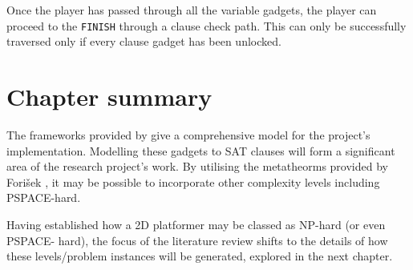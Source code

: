 \documentclass[11pt, a4paper, oneside]{report} %
\begin{document}
Once the player has passed through all the variable gadgets, the player can proceed to the
\texttt{FINISH} through a clause check path. This can only be successfully traversed only if every
clause gadget has been unlocked.






\section{Chapter summary}

The frameworks provided by \cite{Aloupis2012} give a comprehensive model for the
project's implementation. Modelling these gadgets to SAT clauses will form a
significant area of the research project's work. By utilising the metatheorms
provided by Fori\v{s}ek \cite{DBLP:conf/fun/Forisek10}, it may be possible to
incorporate other complexity levels including PSPACE-hard.

Having established how a 2D platformer may be classed as NP-hard (or even
PSPACE- hard), the focus of the literature review shifts to the details of how
these levels/problem instances will be generated, explored in the next chapter.




\end{document}
